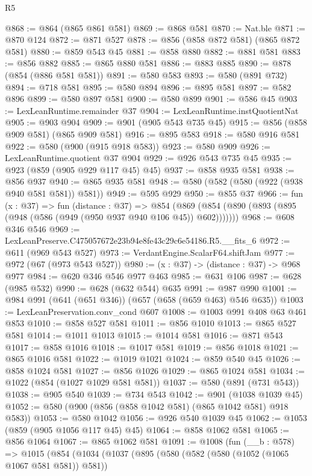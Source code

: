 \begin{lexlean}{R5}
\begin{coremodule}
@868 := @864 (@865 @861 @581)
@869 := @868 @581
@870 := Nat.ble
@871 := @870 @124
@872 := @871 @527
@878 := @856 (@858 @872 @581) (@865 @872 @581)
@880 := @859 @543 @45
@881 := @858 @880
@882 := @881 @581
@883 := @856 @882
@885 := @865 @880 @581
@886 := @883 @885
@890 := @878 (@854 (@886 @581 @581))
@891 := @580 @583
@893 := @580 (@891 @732)
@894 := @718 @581
@895 := @580 @894
@896 := @895 @581
@897 := @582 @896
@899 := @580 @897 @581
@900 := @580 @899
@901 := @586 @45
@903 := LexLeanRuntime.remainder @37
@904 := LexLeanRuntime.instQuotientNat
@905 := @903 @904
@909 := @901 (@905 @543 @735 @45)
@915 := @856 (@858 @909 @581) (@865 @909 @581)
@916 := @895 @583
@918 := @580 @916 @581
@922 := @580 (@900 (@915 @918 @583))
@923 := @580 @909
@926 := LexLeanRuntime.quotient @37 @904
@929 := @926 @543 @735 @45
@935 := @923 (@859 (@905 @929 @117 @45) @45)
@937 := @858 @935 @581
@938 := @856 @937
@940 := @865 @935 @581
@948 := @580 (@582 (@580 (@922 (@938 @940 @581 @581)) @581))
@949 := @595 @929
@950 := @855 @37
@966 := fun (x : @37) =>
  fun (distance : @37) =>
  @854 (@869 (@854 (@890 (@893 (@895 (@948 (@586 (@949 (@950 @937 @940 @106 @45)) @602)))))))
@968 := @608 @346 @546
@969 := LexLeanPreserve.C475057672e23b94e8fe43c29c6e54186.R5.__fits_6
@972 := @611 (@969 @543 @527)
@973 := VerdantEngine.ScalarF64.shiftJam
@977 := @972 (@67 (@973 @543 @527))
@980 := (x : @37) -> (distance : @37) -> @968 @977
@984 := @620 @346 @546 @977 @463
@985 := @631 @106
@987 := @628 (@985 @532)
@990 := @628 (@632 @544) @635
@991 := @987 @990
@1001 := @984 @991 (@641 (@651 @346)) (@657 (@658 (@659 @463) @546 @635))
@1003 := LexLeanPreservation.conv_cond @607
@1008 := @1003 @991 @408 @63 @461 @853
@1010 := @858 @527 @581
@1011 := @856 @1010
@1013 := @865 @527 @581
@1014 := @1011 @1013
@1015 := @1014 @581
@1016 := @871 @543
@1017 := @858 @1016
@1018 := @1017 @581
@1019 := @856 @1018
@1021 := @865 @1016 @581
@1022 := @1019 @1021
@1024 := @859 @540 @45
@1026 := @858 @1024 @581
@1027 := @856 @1026
@1029 := @865 @1024 @581
@1034 := @1022 (@854 (@1027 @1029 @581 @581))
@1037 := @580 (@891 (@731 @543))
@1038 := @905 @540
@1039 := @734 @543
@1042 := @901 (@1038 @1039 @45)
@1052 := @580 (@900 (@856 (@858 @1042 @581) (@865 @1042 @581) @918 @583))
@1053 := @580 @1042
@1056 := @926 @540 @1039 @45
@1062 := @1053 (@859 (@905 @1056 @117 @45) @45)
@1064 := @858 @1062 @581
@1065 := @856 @1064
@1067 := @865 @1062 @581
@1091 := @1008
    (fun (__b : @578) =>
    @1015
      (@854
        (@1034
          (@1037
            (@895
              (@580
                (@582 (@580 (@1052 (@1065 @1067 @581 @581)) @581))

\end{coremodule}
\end{lexlean}
